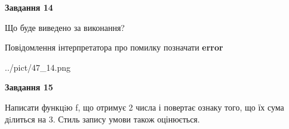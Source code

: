 \documentclass[11pt, ukrainian]{article}
\begin{document}
{\begin {large}
{\begin {center}\textbf{Завдання 14}\end {center}}\par
Що буде виведено за виконання? \par
Повідомлення інтерпретатора про помилку позначати \textbf{error}

\begin{center}
	{../pict/47_14.png}
\end{center}
\newpage

{\begin {center}\textbf{Завдання 15}\end {center}}\par

Написати функцiю f, що отримує 2 числа і повертає ознаку того, що їх сума дiлиться на 3. Стиль запису умови також оцінюється.\par
\newpage

\end {large}}
\end{document}
